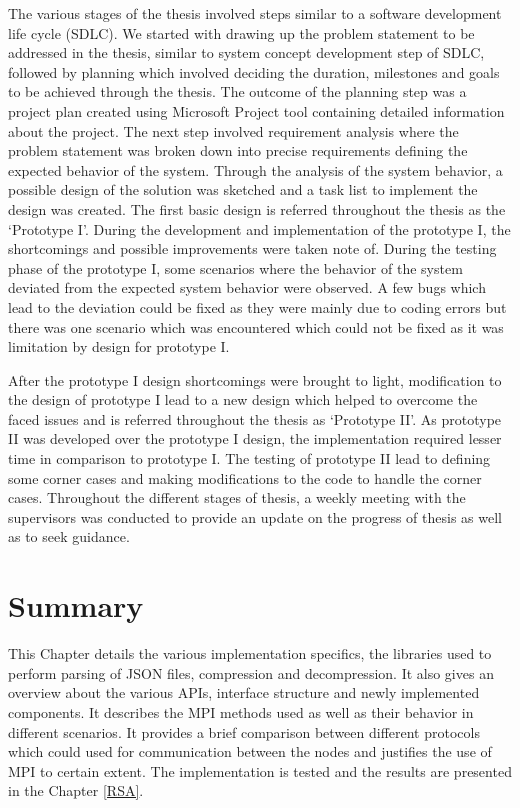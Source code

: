 The various stages of the thesis involved steps similar to a software development life cycle (SDLC). We started with drawing up the problem statement to be addressed in the thesis, similar to system concept development step of SDLC, followed by planning which involved deciding the duration, milestones and goals to be achieved through the thesis. The outcome of the planning step was a project plan created using Microsoft Project tool containing detailed information about the project. The next step involved requirement analysis where the problem statement was broken down into precise requirements defining the expected behavior of the system. Through the analysis of the system behavior, a possible design of the solution was sketched and a task list to implement the design was created. The first basic design is referred throughout the thesis as the {\lq}Prototype I{\rq}. During the development and implementation of the prototype I, the shortcomings and possible improvements were taken note of. During the testing phase of the prototype I, some scenarios where the behavior of the system deviated from the expected system behavior were observed. A few bugs which lead to the deviation could be fixed as they were mainly due to coding errors but there was one scenario which was encountered which could not be fixed as it was limitation by design for prototype I. \newline

After the prototype I design shortcomings were brought to light, modification to the design of prototype I lead to a new design which helped to overcome the faced issues and is referred throughout the thesis as {\lq}Prototype II{\rq}. As prototype II was developed over the prototype I design, the implementation required lesser time in comparison to prototype I. The testing of prototype II lead to defining some corner cases and making modifications to the code to handle the corner cases. Throughout the different stages of thesis, a weekly meeting with the supervisors was conducted to provide an update on the progress of thesis as well as to seek guidance.

\section{Summary}

This Chapter details the various implementation specifics, the libraries used to perform parsing of JSON files, compression and decompression. It also gives an overview about the various APIs, interface structure and newly implemented components. It describes the MPI methods used as well as their behavior in different scenarios. It provides a brief comparison between different protocols which could used for communication between the nodes and justifies the use of MPI to certain extent. The implementation is tested and the results are presented in the Chapter \ref{RSA}. 
